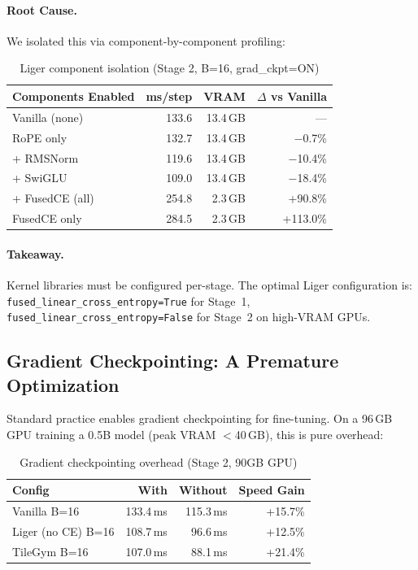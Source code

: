 \documentclass[11pt,a4paper]{article}
\begin{document}
\paragraph{Root Cause.} We isolated this via component-by-component profiling:

\begin{table}[H]
\centering
\caption{Liger component isolation (Stage 2, B=16, grad\_ckpt=ON)}
\label{tab:liger_isolation}
\small
\begin{tabular}{@{}lrrr@{}}
\toprule
Components Enabled & ms/step & VRAM & $\Delta$ vs Vanilla \\
\midrule
Vanilla (none) & 133.6 & 13.4\,GB & --- \\
RoPE only & 132.7 & 13.4\,GB & $-$0.7\% \\
+ RMSNorm & 119.6 & 13.4\,GB & $-$10.4\% \\
+ SwiGLU & 109.0 & 13.4\,GB & $-$18.4\% \\
+ FusedCE (all) & 254.8 & 2.3\,GB & +90.8\% \\
FusedCE only & 284.5 & 2.3\,GB & +113.0\% \\
\bottomrule
\end{tabular}
\end{table}

\paragraph{Takeaway.} Kernel libraries must be configured per-stage. The optimal Liger
configuration is: \texttt{fused\_linear\_cross\_entropy=True} for Stage~1,
\texttt{fused\_linear\_cross\_entropy=False} for Stage~2 on high-VRAM GPUs.

\subsection{Gradient Checkpointing: A Premature Optimization}

Standard practice enables gradient checkpointing for fine-tuning. On a 96\,GB GPU training
a 0.5B model (peak VRAM $<$40\,GB), this is pure overhead:

\begin{table}[H]
\centering
\caption{Gradient checkpointing overhead (Stage 2, 90GB GPU)}
\label{tab:gradckpt}
\begin{tabular}{@{}lrrr@{}}
\toprule
Config & With & Without & Speed Gain \\
\midrule
Vanilla B=16 & 133.4\,ms & 115.3\,ms & +15.7\% \\
Liger (no CE) B=16 & 108.7\,ms & 96.6\,ms & +12.5\% \\
TileGym B=16 & 107.0\,ms & 88.1\,ms & +21.4\% \\
\bottomrule
\end{tabular}
\end{table}
\end{document}

